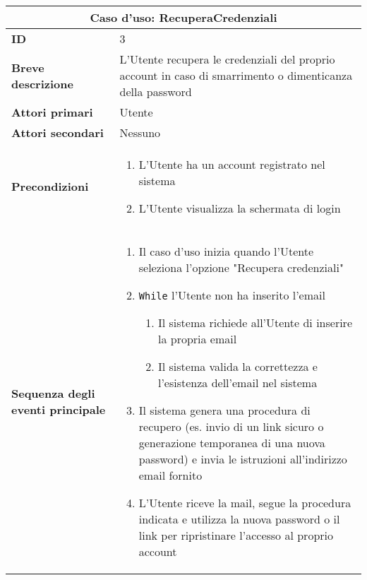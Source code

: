 \documentclass[a4paper]{report}
\begin{document}
\clearpage
\begin{table}[H]
\vspace*{-0cm}
\renewcommand{\arraystretch}{1.9}
\begin{tabular}{|p{3.9cm}|p{9.9cm}|}
\hline
\multicolumn{2}{|c|}{\textbf{Caso d’uso: RecuperaCredenziali}} \\ \hline
\textbf{ID} & 3 \\ \hline
\textbf{Breve descrizione} & L’Utente recupera le credenziali del proprio account in caso di smarrimento o dimenticanza della password \\ \hline
\textbf{Attori primari} & Utente \\ \hline
\textbf{Attori secondari} & Nessuno \\ \hline
\textbf{Precondizioni} & \begin{enumerate}[leftmargin=14pt,label=\arabic*.,labelsep=0.5em,topsep=0pt,partopsep=0pt,parsep=0pt,itemsep=0pt]
    \item L'Utente ha un account registrato nel sistema
    \item L'Utente visualizza la schermata di login
\end{enumerate} \\ \hline
\textbf{Sequenza degli eventi principale} &
\begin{enumerate}[leftmargin=14pt,label=\arabic*.,labelsep=0.5em,topsep=0pt,partopsep=0pt,parsep=0pt,itemsep=0pt]
    \item Il caso d'uso inizia quando l'Utente seleziona l’opzione "Recupera credenziali"
    \item \texttt{While} l'Utente non ha inserito l'email
    \begin{enumerate}[label=\arabic{enumi}.\arabic*.,leftmargin=22pt,labelsep=0.5em,topsep=0pt,partopsep=0pt,parsep=0pt,itemsep=0pt]
        \item Il sistema richiede all’Utente di inserire la propria email
        \item Il sistema valida la correttezza e l’esistenza dell’email nel sistema
    \end{enumerate}
    \item Il sistema genera una procedura di recupero (es. invio di un link sicuro o generazione temporanea di una nuova password) e invia le istruzioni all’indirizzo email fornito
    \item L'Utente riceve la mail, segue la procedura indicata e utilizza la nuova password o il link per ripristinare l’accesso al proprio account
\end{enumerate}\\ \hline

\end{tabular}
\end{table}
\end{document}
